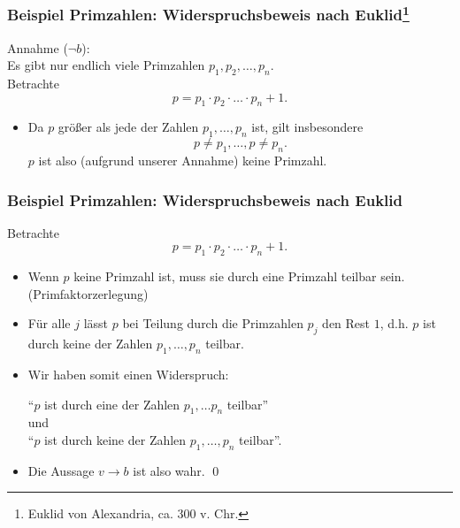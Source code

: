 \documentclass[
				hyperref={pdftex,
						breaklinks,
						pdfauthor={Andreas Weber},
						pdftitle={Logik und Algebra},
						colorlinks=true,
						urlcolor=blue,
						linkcolor=		%
				},
				xcolor=dvipsnames
			]
			{beamer}
\newcommand{\itemColor}{\usebeamercolor[fg]{itemize item}}
\begin{document}
%
%
\begin{frame}\frametitle{Beispiel Primzahlen: Widerspruchsbeweis nach Euklid\footnote{Euklid von Alexandria, ca. 300 v. Chr.} }
	
	{\itemColor Annahme ($\neg b$):}\\ 
	Es gibt nur endlich viele Primzahlen $p_1, p_2, \ldots, p_n$.\\[3mm]
	
	\pause
	Betrachte
	$$	
		p = p_1\cdot p_2 \cdot \ldots \cdot p_n + 1.
	$$
	\begin{itemize}
		\item Da $p$ gr\"o{\ss}er als jede der Zahlen $p_1, \ldots, p_n$ ist, gilt insbesondere
			$$
				p \neq p_1, \ldots, p\neq p_n.
			$$
			$p$ ist also (aufgrund unserer Annahme) keine Primzahl.
	\end{itemize}
	
\end{frame}
%
%
\begin{frame}\frametitle{Beispiel Primzahlen: Widerspruchsbeweis nach Euklid}
	
	Betrachte
	$$	
		p = p_1\cdot p_2 \cdot \ldots \cdot p_n + 1.
	$$
	\begin{itemize}
		\item Wenn $p$ keine Primzahl ist, muss sie durch eine Primzahl teilbar sein. (Primfaktorzerlegung)
		\pause
		\item Für alle $j$ l\"asst $p$ bei Teilung durch die Primzahlen $p_j$ den Rest $1$, 
		d.h. $p$ ist durch keine der Zahlen $p_1,\ldots, p_n$ teilbar.
		\pause
		\item Wir haben somit einen Widerspruch:\\ 
		\begin{center}
			``$p$ ist durch eine der Zahlen $p_1,\ldots p_n$ teilbar'' \\
			und \\
			``$p$ ist durch keine der Zahlen $p_1,\ldots, p_n$ teilbar''.
		\end{center}
		\pause
		\item Die Aussage $v \rightarrow b$ ist also wahr. \qed
	\end{itemize}
	
\end{frame}
%
%
\end{document}
